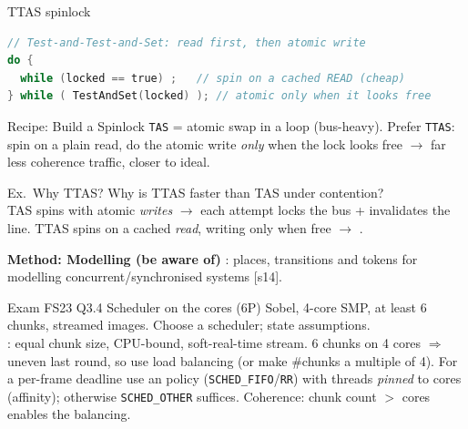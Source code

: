 \begin{code}{TTAS spinlock}
\begin{lstlisting}[language=C, style=basesmol]
// Test-and-Test-and-Set: read first, then atomic write
do {
  while (locked == true) ;   // spin on a cached READ (cheap)
} while ( TestAndSet(locked) ); // atomic only when it looks free
\end{lstlisting}
\end{code}

\begin{KR}{Recipe: Build a Spinlock}
    \texttt{TAS} = atomic swap in a loop (bus-heavy). Prefer \texttt{TTAS}: spin on a plain read, do the atomic write \emph{only} when the lock looks free $\to$ far less coherence traffic, closer to ideal.
\end{KR}

\begin{example2}{Ex.\ Why TTAS?}
    Why is TTAS faster than TAS under contention?
     \\ 
    TAS spins with atomic \emph{writes} $\to$ each attempt locks the bus + invalidates the line. TTAS spins on a cached \emph{read}, writing only when free $\to$ .
\end{example2}

\begin{remark}
    \textbf{Method: Modelling (be aware of)} : places, transitions and tokens for modelling concurrent/synchronised systems [s14].
\end{remark}

\begin{example2}{Exam FS23 Q3.4 Scheduler on the cores (6P)}
    Sobel, 4-core SMP, at least 6 chunks, streamed images. Choose a scheduler; state assumptions.
     \\ 
    : equal chunk size, CPU-bound, soft-real-time stream. 6 chunks on 4 cores $\Rightarrow$ uneven last round, so use  load balancing (or make \#chunks a multiple of 4). For a per-frame deadline use an  policy (\texttt{SCHED\_FIFO}/\texttt{RR}) with threads \emph{pinned} to cores (affinity); otherwise \texttt{SCHED\_OTHER} suffices. Coherence: chunk count $>$ cores enables the balancing.
\end{example2}
